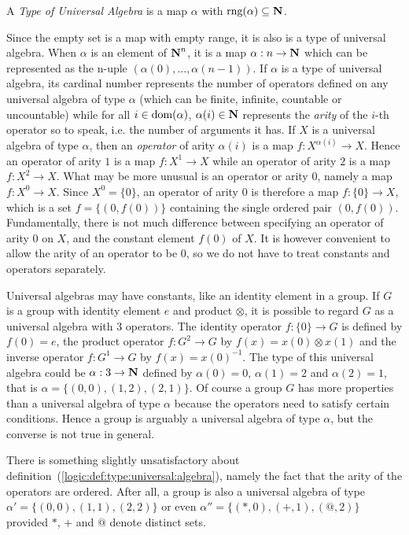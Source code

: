 \begin{defin}\label{logic:def:type:universal:algebra}
A {\em Type of Universal Algebra} is a map $\alpha$ with $\mbox{\rm rng}(\alpha)\subseteq\mbox{$\bf N$}$.
\end{defin}

Since the empty set is a map with empty range, it is also is a type
of universal algebra. When $\alpha$ is an element of $\mbox{$\bf N$}^{n}$, it is
a map $\alpha:n\to\mbox{$\bf N$}$ which can be represented as the n-uple
$(\alpha(0),\ldots,\alpha(n-1))$. If $\alpha$ is a type of universal
algebra, its cardinal number represents the number of operators
defined on any universal algebra of type $\alpha$ (which can be
finite, infinite, countable or uncountable) while for all $i\in
\mbox{\rm dom}(\alpha)$, $\alpha(i)\in\mbox{$\bf N$}$ represents the {\em arity} of the
$i$-th operator so to speak, i.e. the number of arguments it has. If
$X$ is a universal algebra of type $\alpha$, then an {\em operator}
of arity $\alpha(i)$ is a map $f:X^{\alpha(i)}\to X$. Hence an
operator of arity $1$ is a map $f:X^{1}\to X$ while an operator of
arity $2$ is a map $f:X^{2}\to X$. What may be more unusual is an
operator or arity $0$, namely a map $f:X^{0}\to X$. Since
$X^{0}=\{0\}$, an operator of arity $0$ is therefore a map
$f:\{0\}\to X$, which is a set $f=\{(0,f(0))\}$ containing the
single ordered pair $(0,f(0))$. Fundamentally, there is not much
difference between specifying an operator of arity $0$ on $X$, and
the constant element $f(0)$ of $X$. It is however convenient to
allow the arity of an operator to be $0$, so we do not have to treat
constants and operators separately.

Universal algebras may have constants, like an identity element in a
group. If $G$ is a group with identity element $e$ and product
$\otimes$, it is possible to regard $G$ as a universal algebra with
$3$ operators. The identity operator $f:\{0\}\to G$ is defined by
$f(0)=e$, the product operator $f:G^{2}\to G$ by $f(x)=x(0)\otimes
x(1)$ and the inverse operator $f:G^{1}\to G$ by $f(x)=x(0)^{-1}$.
The type of this universal algebra could be $\alpha:3\to\mbox{$\bf N$}$ defined
by $\alpha(0)=0$, $\alpha(1)=2$ and $\alpha(2)=1$, that is $\alpha
=\{(0,0),(1,2),(2,1)\}$. Of course a group $G$ has more properties
than a universal algebra of type $\alpha$ because the operators need
to satisfy certain conditions. Hence a group is arguably a universal
algebra of type $\alpha$, but the converse is not true in general.

There is something slightly unsatisfactory about
definition~(\ref{logic:def:type:universal:algebra}), namely the fact
that the arity of the operators are ordered. After all, a group is
also a universal algebra of type $\alpha'=\{(0,0),(1,1),(2,2)\}$ or
even $\alpha''=\{(*,0),(+,1),(@,2)\}$ provided $*$, $+$ and $@$
denote distinct sets.

